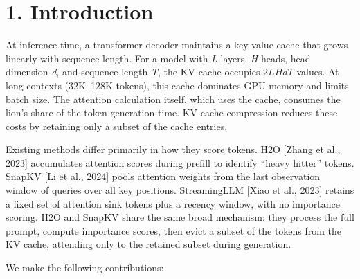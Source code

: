 \documentclass[10pt,letterpaper]{article}
\begin{document}
\begin{abstract}
WTV faithfulness diagnoses these patterns at the level of the model's
probability distributions, revealing structural causes that word-level
output comparison alone cannot expose. \(F_{\text{out}}\) captures the user-visible
consequence directly: whether the compressed model produces the same
words. The two metrics complement each other --- \(F_{\text{out}}\) can be inflated
on short-answer tasks in ways \(F_{\text{WTV}}\) is not, while \(F_{\text{WTV}}\) provides reliable
method rankings across all conditions.

\end{abstract}

\hypertarget{introduction}{%
\section{1. Introduction}\label{introduction}}

At inference time, a transformer decoder maintains a key-value cache
that grows linearly with sequence length. For a model with \emph{L}
layers, \emph{H} heads, head dimension \emph{d}, and sequence length
\emph{T}, the KV cache occupies \emph{\(2LHdT\)} values. At long
contexts (32K--128K tokens), this cache dominates GPU memory and limits
batch size. The attention calculation itself, which uses the cache,
consumes the lion's share of the token generation time. KV cache
compression reduces these costs by retaining only a subset of the cache
entries.

Existing methods differ primarily in how they score tokens. H2O {[}Zhang
et al., 2023{]} accumulates attention scores during prefill to identify
``heavy hitter'' tokens. SnapKV {[}Li et al., 2024{]} pools attention
weights from the last observation window of queries over all key
positions. StreamingLLM {[}Xiao et al., 2023{]} retains a fixed set of
attention sink tokens plus a recency window, with no importance scoring.
H2O and SnapKV share the same broad mechanism: they process the full
prompt, compute importance scores, then evict a subset of the tokens
from the KV cache, attending only to the retained subset during
generation.

We make the following contributions:
\end{document}
